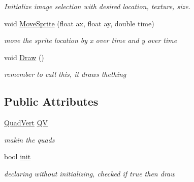 \begin{DoxyCompactItemize}
\begin{DoxyCompactList}\small\item\em Initialize image selection with desired location, texture, size. \end{DoxyCompactList}\item 
\hypertarget{class_basic_sprite_ab1ea662960773bad181a834b61eaece1}{}void \hyperlink{class_basic_sprite_ab1ea662960773bad181a834b61eaece1}{Move\+Sprite} (float ax, float ay, double time)\label{class_basic_sprite_ab1ea662960773bad181a834b61eaece1}

\begin{DoxyCompactList}\small\item\em move the sprite location by x over time and y over time \end{DoxyCompactList}\item 
\hypertarget{class_basic_sprite_a183b22624dac1b6ef581f88d156fbad5}{}void \hyperlink{class_basic_sprite_a183b22624dac1b6ef581f88d156fbad5}{Draw} ()\label{class_basic_sprite_a183b22624dac1b6ef581f88d156fbad5}

\begin{DoxyCompactList}\small\item\em remember to call this, it draws thething \end{DoxyCompactList}\end{DoxyCompactItemize}
\subsection*{Public Attributes}
\begin{DoxyCompactItemize}
\item 
\hypertarget{class_basic_sprite_ae7354ebadf849f34c2d5b85bcc5a21f5}{}\hyperlink{struct_quad_vert}{Quad\+Vert} \hyperlink{class_basic_sprite_ae7354ebadf849f34c2d5b85bcc5a21f5}{Q\+V}\label{class_basic_sprite_ae7354ebadf849f34c2d5b85bcc5a21f5}

\begin{DoxyCompactList}\small\item\em makin the quads \end{DoxyCompactList}\item 
\hypertarget{class_basic_sprite_a64475e9721fc4f7dbd321b63052e465a}{}bool \hyperlink{class_basic_sprite_a64475e9721fc4f7dbd321b63052e465a}{init}\label{class_basic_sprite_a64475e9721fc4f7dbd321b63052e465a}

\begin{DoxyCompactList}\small\item\em declaring without initializing, checked if true then draw \end{DoxyCompactList}\end{DoxyCompactItemize}


